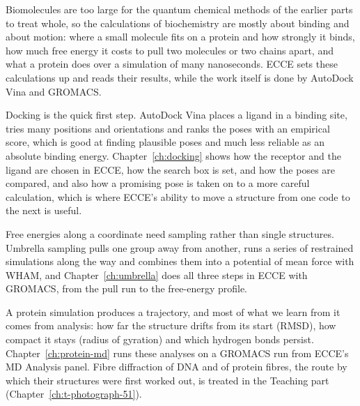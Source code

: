 
Biomolecules are too large for the quantum chemical methods of the earlier parts to treat whole, so the calculations of biochemistry are mostly about binding and about motion: where a small molecule fits on a protein and how strongly it binds, how much free energy it costs to pull two molecules or two chains apart, and what a protein does over a simulation of many nanoseconds. ECCE sets these calculations up and reads their results, while the work itself is done by AutoDock Vina and GROMACS.

Docking is the quick first step. AutoDock Vina places a ligand in a binding site, tries many positions and orientations and ranks the poses with an empirical score, which is good at finding plausible poses and much less reliable as an absolute binding energy. Chapter~\ref{ch:docking} shows how the receptor and the ligand are chosen in ECCE, how the search box is set, and how the poses are compared, and also how a promising pose is taken on to a more careful calculation, which is where ECCE's ability to move a structure from one code to the next is useful.

Free energies along a coordinate need sampling rather than single structures. Umbrella sampling pulls one group away from another, runs a series of restrained simulations along the way and combines them into a potential of mean force with WHAM, and Chapter~\ref{ch:umbrella} does all three steps in ECCE with GROMACS, from the pull run to the free-energy profile.

A protein simulation produces a trajectory, and most of what we learn from it comes from analysis: how far the structure drifts from its start (RMSD), how compact it stays (radius of gyration) and which hydrogen bonds persist. Chapter~\ref{ch:protein-md} runs these analyses on a GROMACS run from ECCE's MD Analysis panel. Fibre diffraction of DNA and of protein fibres, the route by which their structures were first worked out, is treated in the Teaching part (Chapter~\ref{ch:t-photograph-51}).
